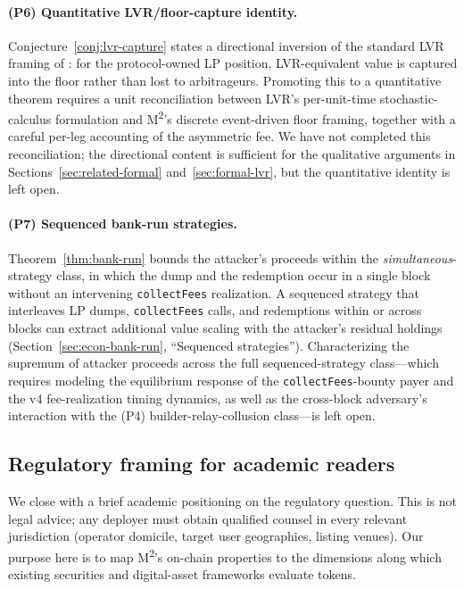 \paragraph{(P6) Quantitative LVR/floor-capture identity.} Conjecture~\ref{conj:lvr-capture} states a directional inversion of the standard LVR framing of \citet{MilionisMoallemiRoughgarden2023}: for the protocol-owned LP position, LVR-equivalent value is captured into the floor rather than lost to arbitrageurs. Promoting this to a quantitative theorem requires a unit reconciliation between LVR's per-unit-time stochastic-calculus formulation and M\textsuperscript{2}'s discrete event-driven floor framing, together with a careful per-leg accounting of the asymmetric fee. We have not completed this reconciliation; the directional content is sufficient for the qualitative arguments in Sections~\ref{sec:related-formal} and~\ref{sec:formal-lvr}, but the quantitative identity is left open.

\paragraph{(P7) Sequenced bank-run strategies.} Theorem~\ref{thm:bank-run} bounds the attacker's proceeds within the \emph{simultaneous}-strategy class, in which the dump and the redemption occur in a single block without an intervening \texttt{collectFees} realization. A sequenced strategy that interleaves LP dumps, \texttt{collectFees} calls, and redemptions within or across blocks can extract additional value scaling with the attacker's residual holdings (Section~\ref{sec:econ-bank-run}, ``Sequenced strategies''). Characterizing the supremum of attacker proceeds across the full sequenced-strategy class---which requires modeling the equilibrium response of the \texttt{collectFees}-bounty payer and the v4 fee-realization timing dynamics, as well as the cross-block adversary's interaction with the (P4) builder-relay-collusion class---is left open.

\subsection{Regulatory framing for academic readers}
\label{sec:lim-regulatory}

We close with a brief academic positioning on the regulatory question. This is not legal advice; any deployer must obtain qualified counsel in every relevant jurisdiction (operator domicile, target user geographies, listing venues). Our purpose here is to map M\textsuperscript{2}'s on-chain properties to the dimensions along which existing securities and digital-asset frameworks evaluate tokens.

